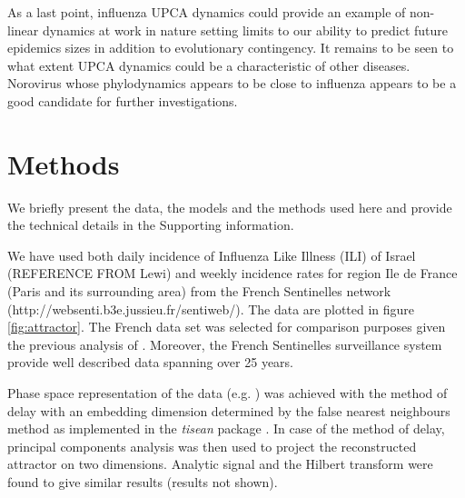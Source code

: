 As a last point, influenza UPCA dynamics could provide an example of
non-linear dynamics at work in nature setting limits to our ability to
predict future epidemics sizes in addition to evolutionary
contingency. It remains to be seen to what extent UPCA dynamics could
be a characteristic of other diseases. Norovirus whose phylodynamics
appears to be close to influenza \citep{Lopman2008} appears to be a
good candidate for further investigations.





\section*{Methods}

We briefly present the data, the models and the methods used here and
provide the technical details in the Supporting information.

We have used both daily incidence of Influenza Like Illness (ILI) of
Israel (REFERENCE FROM Lewi) and weekly incidence rates for region Ile
de France (Paris and its surrounding area) from the French Sentinelles
network (http://websenti.b3e.jussieu.fr/sentiweb/). The data are
plotted in figure \ref{fig:attractor}. The French data set was
selected for comparison purposes given the previous analysis of
\citet{Finkenstaedt2005}. Moreover, the French Sentinelles surveillance
system provide well described data spanning over 25 years.
 

Phase space representation of the data (e.g. \citet{Kantz2003}) was
achieved with the method of delay with an embedding dimension
determined by the false nearest neighbours method as implemented in
the \textit{tisean} package \citep{Kantz2003}. In case of the method
of delay, principal components analysis was then used to project the
reconstructed attractor on two dimensions.  Analytic signal and the
Hilbert transform were found to give similar results (results not
shown).

